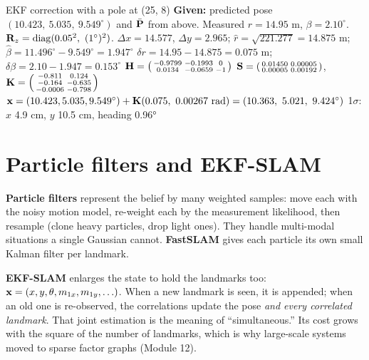 \begin{worked}{EKF correction with a pole at (25, 8)}
\textbf{Given:} predicted pose $(10.423,\ 5.035,\ 9.549^\circ)$ and $\bar{\mathbf{P}}$ from above. Measured $r=14.95$ m, $\beta=2.10^\circ$. $\vect R_z=\operatorname{diag}(0.05^2,\ (1^\circ)^2)$.
 $\Delta x=14.577$, $\Delta y=2.965$; $\hat r=\sqrt{221.277}=14.875$ m; $\hat\beta=11.496^\circ-9.549^\circ=1.947^\circ$
 $\delta r=14.95-14.875=0.075$ m;\ $\delta\beta=2.10-1.947=0.153^\circ$
 $\mathbf{H}=\begin{psmallmatrix}-0.9799&-0.1993&0\\0.0134&-0.0659&-1\end{psmallmatrix}$
 $\mathbf{S}=\begin{psmallmatrix}0.01450&0.00005\\0.00005&0.00192\end{psmallmatrix}$,\quad
$\mathbf{K}=\begin{psmallmatrix}-0.811&0.124\\-0.164&-0.635\\-0.0006&-0.798\end{psmallmatrix}$
 $\mathbf{x}=(10.423,5.035,9.549^\circ)+\mathbf{K}(0.075,\ 0.00267\text{ rad})=(10.363,\ 5.021,\ 9.424^\circ)$
 1$\sigma$: $x$ 4.9 cm, $y$ 10.5 cm, heading 0.96°
\end{worked}

\section{Particle filters and EKF-SLAM}
\begin{eng}
\textbf{Particle filters} represent the belief by many weighted samples: move each with the noisy motion model, re-weight each by the measurement likelihood, then resample (clone heavy particles, drop light ones). They handle multi-modal situations a single Gaussian cannot. \textbf{FastSLAM} gives each particle its own small Kalman filter per landmark.

\textbf{EKF-SLAM} enlarges the state to hold the landmarks too: $\mathbf{x}=(x,y,\theta,m_{1x},m_{1y},\ldots)$. When a new landmark is seen, it is appended; when an old one is re-observed, the correlations update the pose \emph{and every correlated landmark}. That joint estimation is the meaning of ``simultaneous.'' Its cost grows with the square of the number of landmarks, which is why large-scale systems moved to sparse factor graphs (Module 12).
\end{eng}

